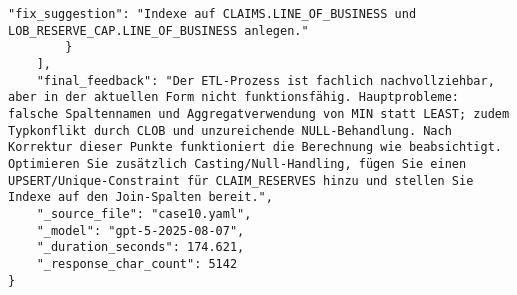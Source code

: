 \begin{lstlisting}[caption={Ausgabe: GPT-5 Anwendungsfall 10 Hauptdurchlauf},label={gpt_case10_prompt1}]
            "fix_suggestion": "Indexe auf CLAIMS.LINE_OF_BUSINESS und LOB_RESERVE_CAP.LINE_OF_BUSINESS anlegen."
        }
    ],
    "final_feedback": "Der ETL-Prozess ist fachlich nachvollziehbar, aber in der aktuellen Form nicht funktionsfähig. Hauptprobleme: falsche Spaltennamen und Aggregatverwendung von MIN statt LEAST; zudem Typkonflikt durch CLOB und unzureichende NULL-Behandlung. Nach Korrektur dieser Punkte funktioniert die Berechnung wie beabsichtigt. Optimieren Sie zusätzlich Casting/Null-Handling, fügen Sie einen UPSERT/Unique-Constraint für CLAIM_RESERVES hinzu und stellen Sie Indexe auf den Join-Spalten bereit.",
    "_source_file": "case10.yaml",
    "_model": "gpt-5-2025-08-07",
    "_duration_seconds": 174.621,
    "_response_char_count": 5142
}
\end{lstlisting}


